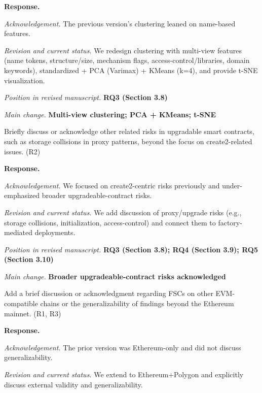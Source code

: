 \documentclass[acmsmall]{acmart}
\begin{document}
	\noindent
	\textbf{Response.}

	\textit{Acknowledgement.} The previous version’s clustering leaned on name-based features.

	\textit{Revision and current status.} We redesign clustering with multi-view features (name
	tokens, structure/size, mechanism flags, access-control/libraries, domain keywords),
	standardized + PCA (Varimax) + KMeans (k=4), and provide t-SNE visualization.

	\textit{Position in revised manuscript.} {\color{red}\textbf{RQ3 (Section 3.8)}}

	\textit{Main change.} {\color{blue}\textbf{Multi-view clustering; PCA + KMeans; t-SNE}}

	\begin{tcolorbox}
		[commentbox,title=Editor/AE -- Comment 7.2] Briefly discuss or acknowledge other related
		risks in upgradable smart contracts, such as storage collisions in proxy patterns, beyond
		the focus on create2-related issues. (R2)
	\end{tcolorbox}

	\noindent
	\textbf{Response.}

	\textit{Acknowledgement.} We focused on create2-centric risks previously and under-emphasized broader
	upgradeable-contract risks.

	\textit{Revision and current status.} We add discussion of proxy/upgrade risks (e.g., storage collisions,
	initialization, access-control) and connect them to factory-mediated deployments.

	\textit{Position in revised manuscript.} {\color{red}\textbf{RQ3 (Section 3.8); RQ4 (Section 3.9); RQ5 (Section 3.10)}}

	\textit{Main change.} {\color{blue}\textbf{Broader upgradeable-contract risks acknowledged}}

	\begin{tcolorbox}
		[commentbox,title=Editor/AE -- Comment 7.3] Add a brief discussion or acknowledgment
		regarding FSCs on other EVM-compatible chains or the generalizability of findings beyond the
		Ethereum mainnet. (R1, R3)
	\end{tcolorbox}

	\noindent
	\textbf{Response.}

	\textit{Acknowledgement.} The prior version was Ethereum-only and did not discuss
	generalizability.

	\textit{Revision and current status.} We extend to Ethereum+Polygon and explicitly discuss external
	validity and generalizability.
\end{document}
